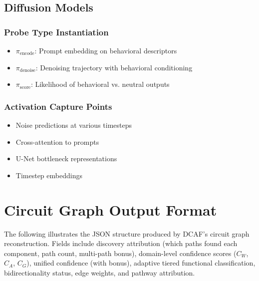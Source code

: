 \documentclass[11pt]{article}
\begin{document}
\subsection{Diffusion Models}
\label{app:diffusion-models}

\subsubsection{Probe Type Instantiation}
\label{app:diffusion-probe-type-instantiation}

\begin{itemize}[nosep]
\item $\pi_{\text{encode}}$: Prompt embedding on behavioral descriptors
\item $\pi_{\text{denoise}}$: Denoising trajectory with behavioral conditioning
\item $\pi_{\text{score}}$: Likelihood of behavioral vs. neutral outputs
\end{itemize}

\subsubsection{Activation Capture Points}
\label{app:diffusion-activation-capture-points}

\begin{itemize}[nosep]
\item Noise predictions at various timesteps
\item Cross-attention to prompts
\item U-Net bottleneck representations
\item Timestep embeddings
\end{itemize}

\section{Circuit Graph Output Format}
\label{app:output-format}

The following illustrates the JSON structure produced by DCAF's circuit graph reconstruction. Fields include discovery attribution (which paths found each component, path count, multi-path bonus), domain-level confidence scores ($C_W$, $C_A$, $C_G$), unified confidence (with bonus), adaptive tiered functional classification, bidirectionality status, edge weights, and pathway attribution.
\end{document}

